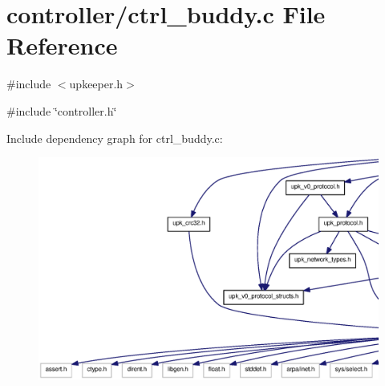 \section{controller/ctrl\_\-buddy.c File Reference}
\label{ctrl__buddy_8c}
{\ttfamily \#include $<$upkeeper.h$>$}\par
{\ttfamily \#include \char`\"{}controller.h\char`\"{}}\par
Include dependency graph for ctrl\_\-buddy.c:
\nopagebreak
\begin{figure}[H]
\begin{center}
\leavevmode
\includegraphics[width=400pt]{ctrl__buddy_8c__incl}
\end{center}
\end{figure}
